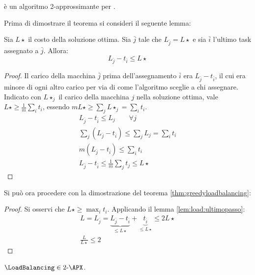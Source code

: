 \begin{theorem}\label{thm:greedyloadbalancing}
	\GreedyLoadBalancing è un algoritmo 2-approssimante per \LoadBalancing.
\end{theorem}
Prima di dimostrare il teorema si consideri il seguente lemma:
\begin{lemma}\label{lem:load:ultimopasso}
	Sia $L\star$ il costo della soluzione ottima. Sia $\bar j$ tale che $L_{\bar j}=L\star$ e sia $\bar i$ l'ultimo task assegnato a $\bar j$. Allora:
	\begin{equation*}
		L_{\bar j}-t_{\bar i} \leq L\star
	\end{equation*}
\end{lemma}
\begin{proof}
	Il carico della macchina $\bar j$ prima dell'assegnamento $\bar i$ era $L_{\bar j}-t_{\bar i}$, il cui era minore di ogni altro carico per via di come l'algoritmo sceglie a chi assegnare.
	Indicato con $L\star_j$ il carico della macchina $j$ nella soluzione ottima, vale $L\star\geq\frac1m\sum_it_i$, essendo $mL\star\geq\sum_jL\star_j=\sum_it_i$.
	\begin{gather*}
		L_{\bar j}-t_{\bar i}\leq L_j \qquad\forall j \\
		\sum_j (L_{\bar j}-t_{\bar i})\leq\sum_j L_j=\sum_i t_i\\
		m(L_{\bar j}-t_{\bar i})\leq \sum_i t_i \\
		L_{\bar j}-t_{\bar i}\leq\frac1m\sum_j t_j\leq L\star
	\end{gather*}
\end{proof}
Si può ora procedere con la dimostrazione del teorema \ref{thm:greedyloadbalancing}:
\begin{proof}
	Si osservi che $L\star\geq\max_it_i$. Applicando il lemma \ref{lem:load:ultimopasso}:
	\begin{gather*}
		L=L_{\bar j}=\underbrace{L_{\bar j}-t_{\bar i}}_{\leq L\star}+\underbrace{t_{\bar i}}_{\leq L\star}\leq 2L\star \\[1ex]
		\frac L{L\star}\leq 2
	\end{gather*}
\end{proof}

\begin{corollario}
	$\LoadBalancing\in\gAPX2$.
\end{corollario}

